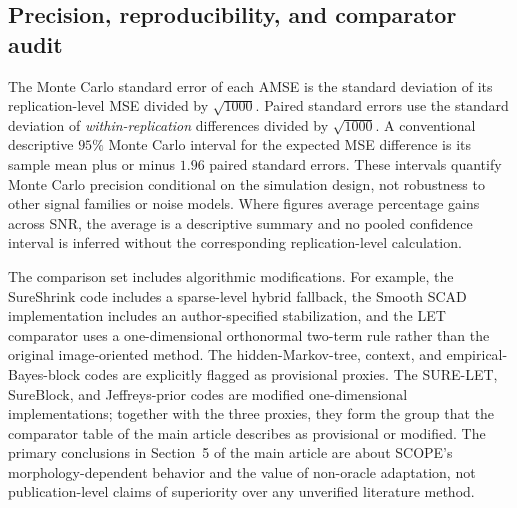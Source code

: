 \documentclass[11pt]{article}
\numberwithin{equation}{section}
\begin{document}
\subsection{Precision, reproducibility, and comparator audit}
\label{sec:supp-precision}
The Monte Carlo standard error of each AMSE is the standard deviation
of its replication-level MSE divided by $\sqrt{1000}$.
Paired standard errors use the standard deviation of
\emph{within-replication} differences divided by $\sqrt{1000}$.
A conventional descriptive $95\%$ Monte Carlo interval for the
expected MSE difference is its sample mean plus or minus $1.96$
paired standard errors.
These intervals quantify Monte Carlo
precision conditional on the simulation design, not robustness to
other signal families or noise models. Where figures average
percentage gains across SNR, the average is a descriptive summary
and no pooled confidence interval is inferred without the
corresponding replication-level calculation.

The comparison set includes algorithmic modifications. For example,
the SureShrink code includes a sparse-level hybrid fallback, the
Smooth SCAD implementation includes an author-specified stabilization,
and the LET comparator uses a one-dimensional orthonormal two-term rule
rather than the original image-oriented method. The hidden-Markov-tree,
context, and empirical-Bayes-block codes are explicitly flagged as
provisional proxies. The SURE-LET, SureBlock, and Jeffreys-prior codes
are modified one-dimensional implementations; together with the three
proxies, they form the group that the comparator table of the main
article describes as provisional or modified.  The primary conclusions
in Section~5 of the main article are about SCOPE's morphology-dependent
behavior and the value of non-oracle adaptation, not publication-level
claims of superiority over any unverified literature method.




\end{document}
